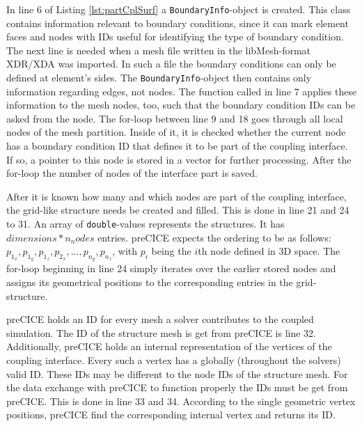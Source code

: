    In line 6 of Listing \ref{lst:partCplSurf} a \texttt{BoundaryInfo}-object is created. This class contains information relevant to boundary conditions, since it can mark element faces and nodes with IDs useful for identifying the type of boundary condition. The next line is needed when a mesh file written in the libMesh-format XDR/XDA was imported. In such a file the boundary conditions can only be defined at element's sides. The \texttt{BoundaryInfo}-object then contains only information regarding edges, not nodes. The function called in line 7 applies these information to the mesh nodes, too, such that the boundary condition IDs can be asked from the node. The for-loop between line 9 and 18 goes through all local nodes of the mesh partition. Inside of it, it is checked whether the current node has a boundary condition ID that defines it to be part of the coupling interface. If so, a pointer to this node is stored in a vector for further processing. After the for-loop the number of nodes of the interface part is saved.
   
   After it is known how many and which nodes are part of the coupling interface, the grid-like structure needs be created and filled. This is done in line 21 and 24 to 31. An array of \texttt{double}-values represents the structures. It has $dimensions * n_nodes$ entries. preCICE expects the ordering to be as follows: $p_{1_x}, p_{1_y}, p_{1_z}, p_{2_x}, \ldots, p_{n_y}, p_{n_z}$, with $p_i$ being the $i$th node defined in 3D space. The for-loop beginning in line 24 simply iterates over the earlier stored nodes and assigns its geometrical positions to the corresponding entries in the grid-structure.
   
   preCICE holds an ID for every mesh a solver contributes to the coupled simulation. The ID of the structure mesh is get from preCICE is line 32. Additionally, preCICE holds an internal representation of the vertices of the coupling interface. Every such a vertex has a globally (throughout the solvers) valid ID. These IDs may be different to the node IDs of the structure mesh. For the data exchange with preCICE to function properly the IDs must be get from preCICE. This is done in line 33 and 34. According to the single geometric vertex positions, preCICE find the corresponding internal vertex and returns its ID.

